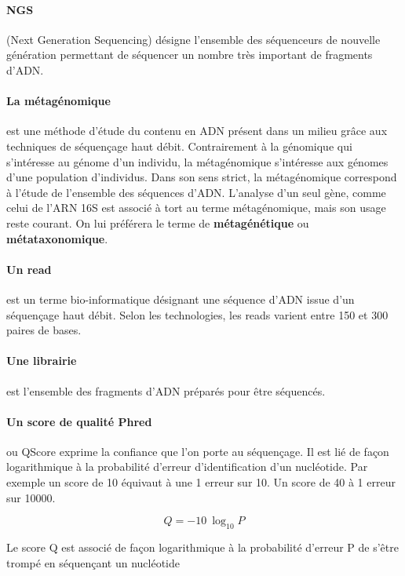 \documentclass[12pt,a4paper]{article}
\begin{document}
\paragraph{NGS}(Next Generation Sequencing) désigne l'ensemble des séquenceurs de nouvelle génération permettant de séquencer un nombre très important de fragments d'ADN.

\paragraph{La métagénomique} est une méthode d’étude du contenu en ADN présent dans un milieu grâce aux techniques de séquençage haut débit. Contrairement à la génomique qui s’intéresse au génome d’un individu, la métagénomique s’intéresse aux génomes d’une population d’individus.
Dans son sens strict, la métagénomique correspond à l’étude de l’ensemble des séquences d'ADN. L’analyse d’un seul gène, comme celui de l’ARN 16S est associé à tort au terme métagénomique, mais son usage reste courant. On lui préférera le terme de \textbf{métagénétique} ou \textbf{métataxonomique}.


\paragraph{Un read} est un terme bio-informatique désignant une séquence d’ADN issue d’un séquençage haut débit. Selon les technologies, les reads varient entre 150 et 300 paires de bases.

\paragraph{Une librairie} est l'ensemble des fragments d'ADN préparés pour être séquencés.

\paragraph{Un score de qualité Phred} ou QScore exprime la confiance que l'on porte au séquençage. Il est lié de façon logarithmique à la probabilité d'erreur d'identification d'un nucléotide.  Par exemple un score de 10 équivaut à une 1 erreur sur 10. Un score de 40 à 1 erreur sur 10000.


\begin{mycapequ}[!h]
   \begin{equation}
    Q = -10 \ \log_{10} P
   \end{equation}
      \caption{Le score Q est associé de façon logarithmique à la probabilité d'erreur P de s'être trompé en séquençant un nucléotide}
\end{mycapequ}
\end{document}
